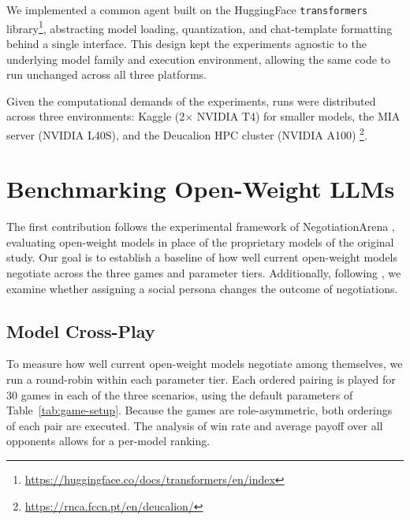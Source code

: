 We implemented a common agent built on the HuggingFace \texttt{transformers} library\footnote{\url{https://huggingface.co/docs/transformers/en/index}}, abstracting model loading, quantization, and chat-template formatting behind a single interface. This design kept the experiments agnostic to the underlying model family and execution environment, allowing the same code to run unchanged across all three platforms.

Given the computational demands of the experiments, runs were distributed across three environments: Kaggle (2$\times$ NVIDIA T4) for smaller models, the MIA server (NVIDIA L40S), and the Deucalion HPC cluster (NVIDIA A100) \footnote{\url{https://rnca.fccn.pt/en/deucalion/}}.

\section{Benchmarking Open-Weight LLMs} \label{sec:benchmarking}


The first contribution follows the experimental framework of NegotiationArena \cite{bianchi_how_2024}, evaluating open-weight models in place of the proprietary models of the original study. Our goal is to establish a baseline of how well current open-weight models negotiate across the three games and parameter tiers. Additionally, following \textcite{bianchi_how_2024}, we examine whether assigning a social persona changes the outcome of negotiations.

\subsection{Model Cross-Play} \label{sec:cross-play}

To measure how well current open-weight models negotiate among themselves, we run a round-robin within each parameter tier. Each ordered pairing is played for 30 games in each of the three scenarios, using the default parameters of Table~\ref{tab:game-setup}. Because the games are role-asymmetric, both orderings of each pair are executed. The analysis of win rate and average payoff over all opponents allows for a per-model ranking. 

